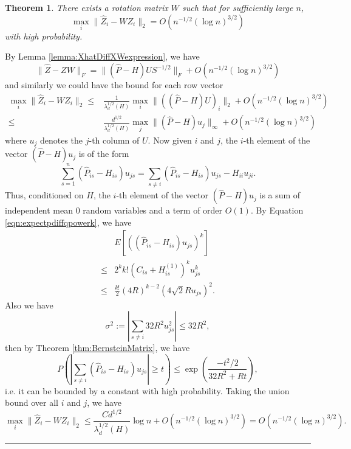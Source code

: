 \documentclass[a4paper]{article}
\newenvironment{proof}{{\bf Proof:  }}{\hfill\rule{2mm}{2mm}}
\newtheorem{theorem}[fact]{Theorem}
\newcommand{\RT}[1]{\marginpar{\footnotesize\color{red}RT: #1}}
\begin{document}
\begin{theorem}
\label{thm:XhatDiffXW}
There exists a rotation matrix $W$ such that for sufficiently large $n$,
\[
	\max_i \| \hat{Z}_i - W Z_i \|_2 = O(n^{-1/2} (\log n)^{3/2})
\]
with high probability.
\end{theorem}
\begin{proof}
By Lemma \ref{lemma:XhatDiffXWexpression}, we have
\[
	\|\hat{Z} - Z W\|_F = \| (\hat{P} - H) U S^{-1/2} \|_F + O(n^{-1/2} (\log n)^{3/2})
\]
and similarly we could have the bound for each row vector
\begin{align*}
	\max_i \| \hat{Z}_i - W Z_i \|_2
    \le & \frac{1}{\lambda_d^{1/2}(H)} \max_i \| ((\hat{P} - H) U)_i \|_2 + O(n^{-1/2} (\log n)^{3/2}) \\
    \le & \frac{d^{1/2}}{\lambda_d^{1/2}(H)} \max_j \| (\hat{P} - H) u_j \|_{\infty} + O(n^{-1/2} (\log n)^{3/2})
\end{align*}
where $u_j$ denotes the $j$-th column of $U$. Now given $i$ and $j$, the $i$-th element of the vector $(\hat{P} - H) u_j$ is of the form
\[
	\sum_{s=1}^n (\hat{P}_{is} - H_{is}) u_{js} = \sum_{s \ne i} (\hat{P}_{is} - H_{is}) u_{js} - H_{ii} u_{ji}.
\]
Thus, conditioned on $H$, the $i$-th element of the vector $(\hat{P} - H) u_j$ is a sum of independent mean 0 random variables and a term of order $O(1)$.
By Equation \ref{eqn:expectpdiffqpowerk}, we have
\begin{align*}
	& E\left[\left((\hat{P}_{is} - H_{is}) u_{js}\right)^k\right] \\ 
    \le & 2^k k! (C_{is} + H_{is}^{(1)})^k u_{js}^k \\
    \le & \frac{k!}{2} (4 R)^{k-2} (4\sqrt{2} R u_{js})^2.
\end{align*}
Also we have
\[
	\sigma^2 := |\sum_{s \ne i} 32 R^2 u_{js}^2|
    \le 32 R^2,
\]
then by Theorem \ref{thm:BernsteinMatrix}, we have
\[
	P \left( \left| \sum_{s \ne i} (\hat{P}_{is} - H_{is}) u_{js} \right| \ge t \right)
    \le \exp \left( \frac{-t^2/2}{32 R^2 + R t} \right),
\]
i.e. it can be bounded by a constant with high probability.
Taking the union bound over all $i$ and $j$, we have
\[
	\max_i \| \hat{Z}_i - W Z_i \|_2
    \le \frac{C d^{1/2}}{\lambda_d^{1/2}(H)} \log n + O(n^{-1/2} (\log n)^{3/2})
    = O(n^{-1/2} (\log n)^{3/2}).
\]
\RT{$\log n$ in the first term?}
\end{proof}
\end{document}
